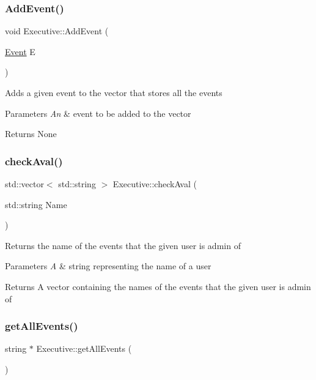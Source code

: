 \subsubsection{\texorpdfstring{Add\+Event()}{AddEvent()}}
{\footnotesize\ttfamily void Executive\+::\+Add\+Event (\begin{DoxyParamCaption}\item[{\mbox{\hyperlink{class_event}{Event}}}]{E }\end{DoxyParamCaption})}

Adds a given event to the vector that stores all the events 
\begin{DoxyParams}{Parameters}
{\em An} & event to be added to the vector \\
\hline
\end{DoxyParams}
\begin{DoxyReturn}{Returns}
None 
\end{DoxyReturn}
\mbox{\label{class_executive_a4099c9d7fba8038ef79df8daddf60f1e}} 
\subsubsection{\texorpdfstring{check\+Aval()}{checkAval()}}
{\footnotesize\ttfamily std\+::vector$<$ std\+::string $>$ Executive\+::check\+Aval (\begin{DoxyParamCaption}\item[{std\+::string}]{Name }\end{DoxyParamCaption})}

Returns the name of the events that the given user is admin of 
\begin{DoxyParams}{Parameters}
{\em A} & string representing the name of a user \\
\hline
\end{DoxyParams}
\begin{DoxyReturn}{Returns}
A vector containing the names of the events that the given user is admin of 
\end{DoxyReturn}
\mbox{\label{class_executive_ada44e998fdc559eba9db2f4edeef0978}} 
\subsubsection{\texorpdfstring{get\+All\+Events()}{getAllEvents()}}
{\footnotesize\ttfamily string $\ast$ Executive\+::get\+All\+Events (\begin{DoxyParamCaption}{ }\end{DoxyParamCaption})}

